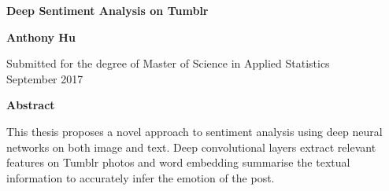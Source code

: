 \newpage
\thispagestyle{plain}
\begin{center}
  \textbf{\Large Deep Sentiment Analysis on Tumblr}

  \vspace*{1cm}
  \textbf{\large Anthony Hu}

  \vspace*{0.5cm}
  {\large Submitted for the degree of Master of Science in Applied Statistics\\ September 2017}

  \vspace*{1cm}
  \textbf{\large Abstract}
\end{center}
This thesis proposes a novel approach to sentiment analysis using deep neural networks on both image and text. Deep convolutional layers extract relevant features on Tumblr photos and word embedding summarise the textual information to accurately infer the emotion of the post.

\begin{spacing}{0.95}
\tableofcontents
\end{spacing}
\listoffigures
\listoftables
\clearpage











